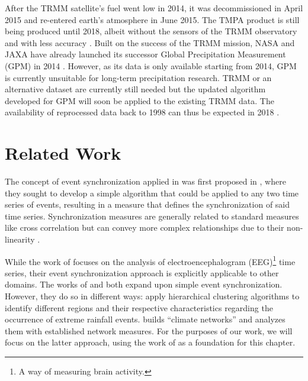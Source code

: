 After the TRMM satellite's fuel went low in 2014, it was decommissioned in April 2015 and re-entered earth's atmosphere in June 2015. The TMPA product is still being produced until 2018, albeit without the sensors of the TRMM observatory and with less accuracy \citep{Huffman.2017}. Built on the success of the TRMM mission, NASA and JAXA have already launched its successor Global Precipitation Measurement (GPM) in 2014 \citep{GoddardEarthScienceDataInformationandServicesCenter.2011}. However, as its data is only available starting from 2014, GPM is currently unsuitable for long-term precipitation research. TRMM or an alternative dataset are currently still needed but the updated algorithm developed for GPM will soon be applied to the existing TRMM data. The availability of reprocessed data back to 1998 can thus be expected in 2018 \citep{Huffman.2016}.

\section{Related Work}
The concept of event synchronization applied in \citet{Stolbova.2015} was first proposed in \citet{QuianQuiroga.2002}, where they sought to develop a simple algorithm that could be applied to any two time series of events, resulting in a measure that defines the synchronization of said time series. Synchronization measures are generally related to standard measures like cross correlation but can convey more complex relationships due to their non-linearity \citep{QuianQuiroga.2002}.

While the work of \citet{QuianQuiroga.2002} focuses on the analysis of electroencephalogram (EEG)\footnote{A way of measuring brain activity.} time series, their event synchronization approach is explicitly applicable to other domains. The works of \citet{Malik.2010} and \citet{Stolbova.2015} both expand upon simple event synchronization. However, they do so in different ways: \citet{Malik.2010} apply hierarchical clustering algorithms to identify different regions and their respective characteristics regarding the occurrence of extreme rainfall events. \citet{Stolbova.2015} builds ``climate networks'' and analyzes them with established network measures. For the purposes of our work, we will focus on the latter approach, using the work of \citet{Stolbova.2015} as a foundation for this chapter.

